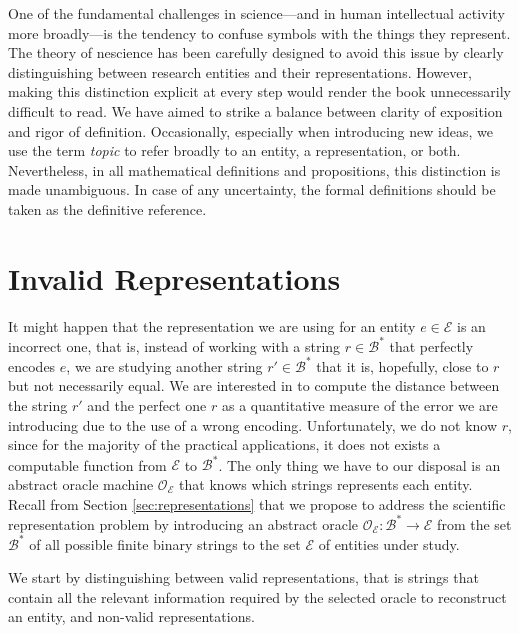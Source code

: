 \begin{remark}
One of the fundamental challenges in science—and in human intellectual activity more broadly—is the tendency to confuse symbols with the things they represent. The theory of nescience has been carefully designed to avoid this issue by clearly distinguishing between research entities and their representations. However, making this distinction explicit at every step would render the book unnecessarily difficult to read. We have aimed to strike a balance between clarity of exposition and rigor of definition. Occasionally, especially when introducing new ideas, we use the term \emph{topic} to refer broadly to an entity, a representation, or both. Nevertheless, in all mathematical definitions and propositions, this distinction is made unambiguous. In case of any uncertainty, the formal definitions should be taken as the definitive reference.
\end{remark}

%
%
\section{Invalid Representations}
\label{sec:invalid_representations}

It might happen that the representation we are using for an entity $e \in \mathcal{E}$ is an incorrect one, that is, instead of working with a string $r \in \mathcal{B}^\ast$ that perfectly encodes $e$, we are studying another string $r' \in \mathcal{B}^\ast$ that it is, hopefully, close to $r$ but not necessarily equal. We are interested in to compute the distance between the string $r'$ and the perfect one $r$ as a quantitative measure of the error we are introducing due to the use of a wrong encoding. Unfortunately, we do not know $r$, since for the majority of the practical applications, it does not exists a computable function from $\mathcal{E}$ to $\mathcal{B}^\ast$. The only thing we have to our disposal is an abstract oracle machine $\mathcal{O}_\mathcal{E}$ that knows which strings represents each entity. Recall from Section \ref{sec:representations} that we propose to address the scientific representation problem by introducing an abstract oracle $\mathcal{O}_\mathcal{E}:\mathcal{B}^\ast \rightarrow \mathcal{E}$ from the set $\mathcal{B}^\ast$ of all possible finite binary strings to the set $\mathcal{E}$ of entities under study.

We start by distinguishing between valid representations, that is strings that contain all the relevant information required by the selected oracle to reconstruct an entity, and non-valid representations.

